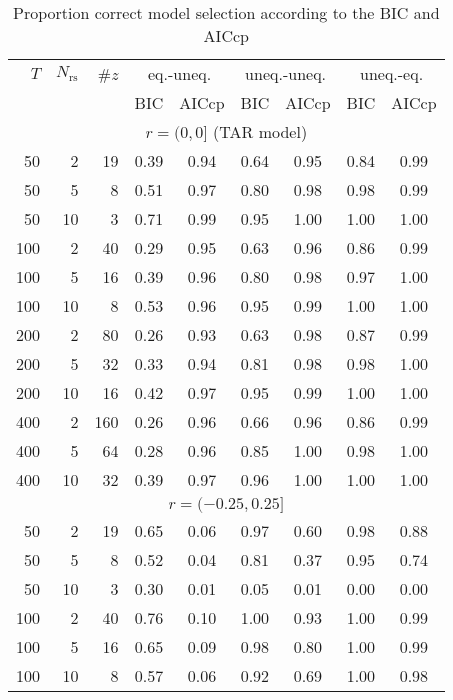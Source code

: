 
\begin{table}
\caption{Proportion correct model selection according to the BIC and AICcp}
\begin{center}
\begin{tabular}{rrr cc cc cc}
\hline
$T$ & $N_{\mathrm{rs}}$ & \#$z$ & \multicolumn{2}{c}{eq.-uneq.} & \multicolumn{2}{c}{uneq.-uneq.} & \multicolumn{2}{c}{uneq.-eq.} \\
\cline{4-9}
\multicolumn{3}{l}{} & BIC & AICcp & BIC & AICcp & BIC & AICcp \\
\hline
  \multicolumn{9}{c}{$r = (0, 0]$ (TAR model)} \\
  50  & 2  & 19  & 0.39 & 0.94 & 0.64 & 0.95 & 0.84 & 0.99 \\ 
  50  & 5  & 8   & 0.51 & 0.97 & 0.80 & 0.98 & 0.98 & 0.99 \\ 
  50  & 10 & 3   & 0.71 & 0.99 & 0.95 & 1.00 & 1.00 & 1.00 \\ 
  100 & 2  & 40  & 0.29 & 0.95 & 0.63 & 0.96 & 0.86 & 0.99 \\ 
  100 & 5  & 16  & 0.39 & 0.96 & 0.80 & 0.98 & 0.97 & 1.00 \\ 
  100 & 10 & 8   & 0.53 & 0.96 & 0.95 & 0.99 & 1.00 & 1.00 \\ 
  200 & 2  & 80  & 0.26 & 0.93 & 0.63 & 0.98 & 0.87 & 0.99 \\ 
  200 & 5  & 32  & 0.33 & 0.94 & 0.81 & 0.98 & 0.98 & 1.00 \\ 
  200 & 10 & 16  & 0.42 & 0.97 & 0.95 & 0.99 & 1.00 & 1.00 \\ 
  400 & 2  & 160 & 0.26 & 0.96 & 0.66 & 0.96 & 0.86 & 0.99 \\ 
  400 & 5  & 64  & 0.28 & 0.96 & 0.85 & 1.00 & 0.98 & 1.00 \\ 
  400 & 10 & 32  & 0.39 & 0.97 & 0.96 & 1.00 & 1.00 & 1.00 \\
  \hline
  \multicolumn{9}{c}{$r = (-0.25, 0.25]$ } \\
  50  & 2  & 19  & 0.65 & 0.06 & 0.97 & 0.60 & 0.98 & 0.88 \\ 
  50  & 5  & 8   & 0.52 & 0.04 & 0.81 & 0.37 & 0.95 & 0.74 \\ 
  50  & 10 & 3   & 0.30 & 0.01 & 0.05 & 0.01 & 0.00 & 0.00 \\
  100 & 2  & 40  & 0.76 & 0.10 & 1.00 & 0.93 & 1.00 & 0.99 \\ 
  100 & 5  & 16  & 0.65 & 0.09 & 0.98 & 0.80 & 1.00 & 0.99 \\ 
  100 & 10 & 8   & 0.57 & 0.06 & 0.92 & 0.69 & 1.00 & 0.98 \\ 

\end{tabular}
\end{center}
\end{table}
